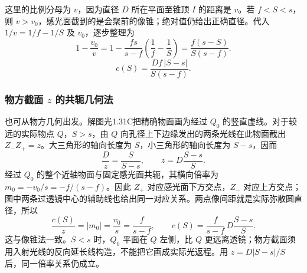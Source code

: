 \documentclass[UTF8,fontset=fandol,a4paper,11pt]{ctexart}
\begin{document}
这里的比例分母为 $v$，因为直径 $D$ 所在平面至锥顶 $I$ 的距离是 $v$。若 $f<S<s$，则 $v>v_0$，感光面截到的是会聚前的像锥；绝对值仍给出正确直径。代入 $1/v=1/f-1/S$ 及 $v_0$，逐步整理为
\[
1-\frac{v_0}{v}
=1-\frac{fs}{s-f}\left(\frac1f-\frac1S\right)
=\frac{f(s-S)}{S(s-f)}.
\]
\[
\boxed{c(S)=\frac{Df\,|S-s|}{S(s-f)}}.
\]

\subsubsection*{物方截面 $z$ 的共轭几何法}
也可从物方几何出发。解图光1.31C把精确物面画为经过 $Q_0$ 的竖直虚线。对于较远的实际物点 $Q$，$S>s$，由 $Q$ 向孔径上下边缘发出的两条光线在此物面截出 $Z_-Z_+=z$。大三角形的轴向长度为 $S$，小三角形的轴向长度为 $S-s$，因而
\[
\frac{D}{z}=\frac{S}{S-s},\qquad
z=D\frac{S-s}{S}.
\]
经过 $Q_0$ 的整个近轴物面与固定感光面共轭，其横向倍率为 $m_0=-v_0/s=-f/(s-f)$。因此 $Z_+$ 对应感光面下方交点，$Z_-$ 对应上方交点；图中两条过透镜中心的辅助线也给出同一对应关系。两点像间距就是实际弥散圆直径，所以
\[
\frac{c(S)}{z}=|m_0|=\frac{v_0}{s}=\frac{f}{s-f},
\qquad
c(S)=\frac{f}{s-f}\,D\frac{S-s}{S}.
\]
这与像锥法一致。$S<s$ 时，$Q_0$ 平面在 $Q$ 左侧，比 $Q$ 更远离透镜；物方截面须用入射光线的反向延长线构造，不能把它画成实际光返程。用 $z=D|S-s|/S$ 后，同一倍率关系仍成立。
\end{document}

